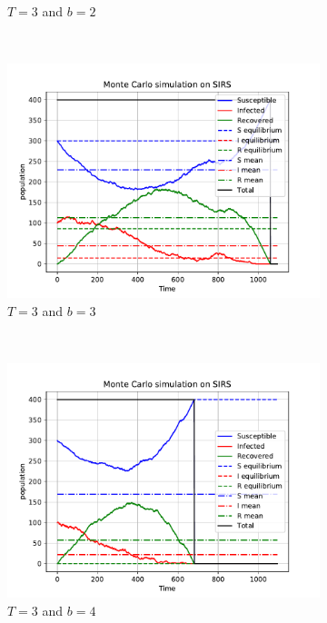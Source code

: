\begin{figure}[H]
\begin{subfigure}{0.49\textwidth}
         \caption{$T = 3$ and $b =2$}
    \end{subfigure}
     ~ 
    \begin{subfigure}{0.49\textwidth}
         \centering
         \includegraphics[width=\linewidth]{../fig/newfig/MC_b3T3.pdf}
         \caption{$T = 3$ and $b =3$}
    \end{subfigure}
     ~ 
    \begin{subfigure}{0.49\textwidth}
         \centering
         \includegraphics[width=\linewidth]{../fig/newfig/MC_b4T3.pdf}
         \caption{$T = 3$ and $b =4$ }
    \end{subfigure}
         ~ 
    \begin{subfigure}{0.6\textwidth}

\end{subfigure}
\end{figure}

